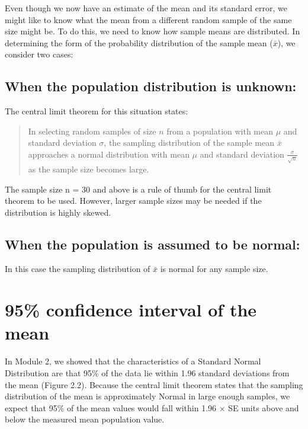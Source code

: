 \documentclass[
]{memoir}
\begin{document}
Even though we now have an estimate of the mean and its standard error, we might like to know what the mean from a different random sample of the same size might be. To do this, we need to know how sample means are distributed. In determining the form of the probability distribution of the sample mean (\(\bar{x}\)), we consider two cases:

\hypertarget{when-the-population-distribution-is-unknown}{%
\subsection{When the population distribution is unknown:}\label{when-the-population-distribution-is-unknown}}

The central limit theorem for this situation states:

\begin{quote}
In selecting random samples of size \(n\) from a population with mean \(\mu\) and standard deviation \(\sigma\), the sampling distribution of the sample mean \(\bar{x}\) approaches a normal distribution with mean \(\mu\) and standard deviation \(\tfrac{\sigma}{\sqrt{n}}\) as the sample size becomes large.
\end{quote}

The sample size n = 30 and above is a rule of thumb for the central limit theorem to be used. However, larger sample sizes may be needed if the distribution is highly skewed.

\hypertarget{when-the-population-is-assumed-to-be-normal}{%
\subsection{When the population is assumed to be normal:}\label{when-the-population-is-assumed-to-be-normal}}

In this case the sampling distribution of \(\bar{x}\) is normal for any sample size.

\hypertarget{confidence-interval-of-the-mean}{%
\section{95\% confidence interval of the mean}\label{confidence-interval-of-the-mean}}

In Module 2, we showed that the characteristics of a Standard Normal Distribution are that 95\% of the data lie within 1.96 standard deviations from the mean (Figure 2.2). Because the central limit theorem states that the sampling distribution of the mean is approximately Normal in large enough samples, we expect that 95\% of the mean values would fall within 1.96 × SE units above and below the measured mean population value.
\end{document}
